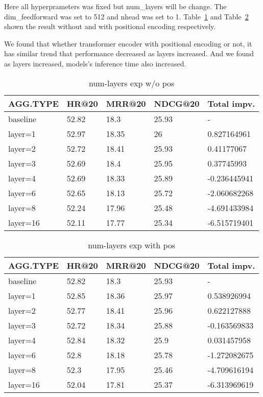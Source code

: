 \documentclass{article}
\begin{document}
Here all hyperprameters was fixed but num\_layers will be change.
The dim\_feedforward was set to 512 and nhead was set to 1.
Table~\ref{num-layers exp w/o pos} and Table~\ref{num-layers exp with pos}
shown the result without and with positional encoding respectively.

We found that whether transformer encoder with positional encoding or not,
it has similar trend that performance decreased as layers increased.
And we found as layers increased, models's inference time also increased.

\begin{table}
    \caption{num-layers exp w/o pos}
    \label{num-layers exp w/o pos}
    \centering
    \begin{tabular}{lllll}
        \toprule
        AGG.TYPE & HR@20 & MRR@20 & NDCG@20 & Total impv.  \\
        \midrule
        baseline & 52.82 & 18.3   & 25.93   & -            \\
        layer=1  & 52.97 & 18.35  & 26      & 0.827164961  \\
        layer=2  & 52.72 & 18.41  & 25.93   & 0.41177067   \\
        layer=3  & 52.69 & 18.4   & 25.95   & 0.37745993   \\
        layer=4  & 52.69 & 18.33  & 25.89   & -0.236445941 \\
        layer=6  & 52.65 & 18.13  & 25.72   & -2.060682268 \\
        layer=8  & 52.24 & 17.96  & 25.48   & -4.691433984 \\
        layer=16 & 52.11 & 17.77  & 25.34   & -6.515719401 \\
        \bottomrule
    \end{tabular}
\end{table}

\begin{table}
    \caption{num-layers exp with pos}
    \label{num-layers exp with pos}
    \centering
    \begin{tabular}{lllll}
        \toprule
        AGG.TYPE & HR@20 & MRR@20 & NDCG@20 & Total impv.  \\
        \midrule
        baseline & 52.82 & 18.3   & 25.93   & -            \\
        layer=1  & 52.85 & 18.36  & 25.97   & 0.538926994  \\
        layer=2  & 52.77 & 18.41  & 25.96   & 0.622127888  \\
        layer=3  & 52.72 & 18.34  & 25.88   & -0.163569833 \\
        layer=4  & 52.84 & 18.32  & 25.9    & 0.031457958  \\
        layer=6  & 52.8  & 18.18  & 25.78   & -1.272082675 \\
        layer=8  & 52.3  & 17.95  & 25.46   & -4.709616194 \\
        layer=16 & 52.04 & 17.81  & 25.37   & -6.313969619 \\
        \bottomrule
    \end{tabular}
\end{table}
\end{document}
